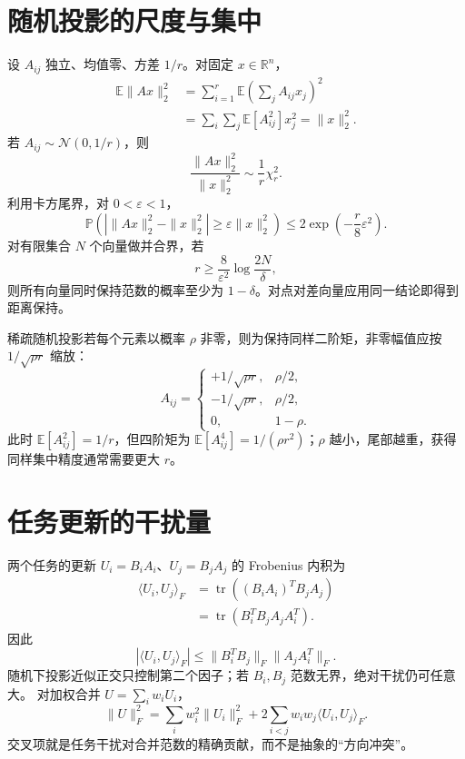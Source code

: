\documentclass[11pt]{article}
\numberwithin{equation}{section}
\newcommand{\R}{\mathbb{R}}
\newcommand{\E}{\mathbb{E}}
\newcommand{\Pp}{\mathbb{P}}
\newcommand{\1}{\mathbf{1}}
\newcommand{\cN}{\mathcal{N}}
\newcommand{\tr}{\operatorname{tr}}
\begin{document}
\section{随机投影的尺度与集中}

设 $A_{ij}$ 独立、均值零、方差 $1/r$。对固定 $x\in\R^n$，
\begin{align}
 \E\|Ax\|_2^2
 &=\sum_{i=1}^{r}\E\left(\sum_jA_{ij}x_j\right)^2\\
 &=\sum_i\sum_j\E[A_{ij}^2]x_j^2
 =\|x\|_2^2.
\end{align}
若 $A_{ij}\sim\cN(0,1/r)$，则
\begin{equation}
 \frac{\|Ax\|_2^2}{\|x\|_2^2}
 \sim\frac1r\chi_r^2.
\end{equation}
利用卡方尾界，对 $0<\varepsilon<1$，
\begin{equation}
 \Pp\left(
 \left|\|Ax\|_2^2-\|x\|_2^2\right|
 \ge\varepsilon\|x\|_2^2\right)
 \le2\exp\left(-\frac r8\varepsilon^2\right).
\end{equation}
对有限集合 $N$ 个向量做并合界，若
\begin{equation}
 r\ge\frac8{\varepsilon^2}\log\frac{2N}{\delta},
\end{equation}
则所有向量同时保持范数的概率至少为 $1-\delta$。对点对差向量应用同一结论即得到距离保持。

稀疏随机投影若每个元素以概率 $\rho$ 非零，则为保持同样二阶矩，非零幅值应按
$1/\sqrt{\rho r}$ 缩放：
\begin{equation}
 A_{ij}=\begin{cases}
 +1/\sqrt{\rho r},&\rho/2,\\
 -1/\sqrt{\rho r},&\rho/2,\\
 0,&1-\rho.
 \end{cases}
\end{equation}
此时 $\E[A_{ij}^2]=1/r$，但四阶矩为
$\E[A_{ij}^4]=1/(\rho r^2)$；$\rho$ 越小，尾部越重，获得同样集中精度通常需要更大 $r$。

\section{任务更新的干扰量}

两个任务的更新 $U_i=B_iA_i$、$U_j=B_jA_j$ 的 Frobenius 内积为
\begin{align}
 \langle U_i,U_j\rangle_F
 &=\tr((B_iA_i)^TB_jA_j)\\
 &=\tr(B_i^TB_jA_jA_i^T).
\end{align}
因此
\begin{equation}
 |\langle U_i,U_j\rangle_F|
 \le\|B_i^TB_j\|_F\|A_jA_i^T\|_F.
\end{equation}
随机下投影近似正交只控制第二个因子；若 $B_i,B_j$ 范数无界，绝对干扰仍可任意大。
对加权合并 $U=\sum_iw_iU_i$，
\begin{equation}
 \|U\|_F^2
 =\sum_iw_i^2\|U_i\|_F^2
 +2\sum_{i<j}w_iw_j\langle U_i,U_j\rangle_F.
\end{equation}
交叉项就是任务干扰对合并范数的精确贡献，而不是抽象的“方向冲突”。
\end{document}
